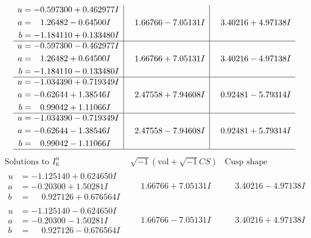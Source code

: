 \documentclass[1p]{elsarticle_modified}
\theoremstyle{definition}
\newcommand{\I}{\sqrt{-1}}
\begin{document}
$$\begin{array}{c|c|c}
\begin{aligned}
u &= -0.597300 + 0.462977 I \\
a &= \phantom{-}1.26482 - 0.64500 I \\
b &= -1.184110 + 0.133480 I\end{aligned}
 & \phantom{-}1.66766 - 7.05131 I & \phantom{-}3.40216 + 4.97138 I \\ \hline\begin{aligned}
u &= -0.597300 - 0.462977 I \\
a &= \phantom{-}1.26482 + 0.64500 I \\
b &= -1.184110 - 0.133480 I\end{aligned}
 & \phantom{-}1.66766 + 7.05131 I & \phantom{-}3.40216 - 4.97138 I \\ \hline\begin{aligned}
u &= -1.034390 + 0.719349 I \\
a &= -0.62644 + 1.38546 I \\
b &= \phantom{-}0.99042 + 1.11066 I\end{aligned}
 & \phantom{-}2.47558 + 7.94608 I & \phantom{-}0.92481 - 5.79314 I \\ \hline\begin{aligned}
u &= -1.034390 - 0.719349 I \\
a &= -0.62644 - 1.38546 I \\
b &= \phantom{-}0.99042 - 1.11066 I\end{aligned}
 & \phantom{-}2.47558 - 7.94608 I & \phantom{-}0.92481 + 5.79314 I\\
 \hline 
 \end{array}$$\newpage$$\begin{array}{c|c|c}  
\text{Solutions to }I^u_{6}& \I (\text{vol} + \sqrt{-1}CS) & \text{Cusp shape}\\
 \hline 
\begin{aligned}
u &= -1.125140 + 0.624650 I \\
a &= -0.20300 + 1.50281 I \\
b &= \phantom{-}0.927126 + 0.676564 I\end{aligned}
 & \phantom{-}1.66766 + 7.05131 I & \phantom{-}3.40216 - 4.97138 I \\ \hline\begin{aligned}
u &= -1.125140 - 0.624650 I \\
a &= -0.20300 - 1.50281 I \\
b &= \phantom{-}0.927126 - 0.676564 I\end{aligned}
 & \phantom{-}1.66766 - 7.05131 I & \phantom{-}3.40216 + 4.97138 I \\ \hline\begin{aligned}

\end{aligned}
\end{array}$$
\end{document}
